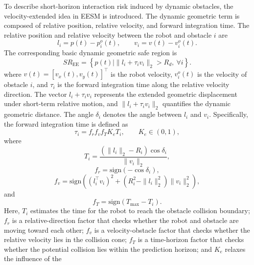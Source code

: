 \documentclass[journal]{IEEEtranTIE}
\begin{document}
    To describe short-horizon interaction risk induced by dynamic obstacles, the
    velocity-extended idea in EESM is introduced. The dynamic geometric term is
    composed of relative position, relative velocity, and forward integration
    time. The relative position and relative velocity between the robot and
    obstacle $i$ are
    \begin{equation}
    l_i=p(t)-p_i^o(t),\qquad v_i=v(t)-v_i^o(t).
    \end{equation}
    The corresponding basic dynamic geometric safe region is
    \begin{equation}
    SR_{\mathrm{EE}} =
    \left\{p(t)\mid
    \|l_i+\tau_i v_i\|_2>R_d,\ \forall i
    \right\}.
    \end{equation}
    where $v(t)=[v_x(t),v_y(t)]^\top$ is the robot velocity, $v_i^o(t)$ is the
    velocity of obstacle $i$, and $\tau_i$ is the forward integration time along
    the relative velocity direction. The vector $l_i+\tau_i v_i$ represents the
    extended geometric displacement under short-term relative motion, and
    $\|l_i+\tau_i v_i\|_2$ quantifies the dynamic geometric distance. The angle
    $\delta_i$ denotes the angle between $l_i$ and $v_i$. Specifically, the
    forward integration time is defined as
    \begin{equation}
    \tau_i=f_r f_v f_T K_e T_i,\qquad K_e\in(0,1),
    \end{equation}
    where
    \begin{equation}
    T_i=\frac{(\|l_i\|_2-R_i)\cos\delta_i}{\|v_i\|_2},
    \end{equation}
    \begin{equation}
    f_r=\mathrm{sign}(-\cos\delta_i),
    \end{equation}
    \begin{equation}
    f_v=\mathrm{sign}\left(
    (l_i^\top v_i)^2+(R_i^2-\|l_i\|_2^2)\|v_i\|_2^2
    \right),
    \end{equation}
    and
    \begin{equation}
    f_T=\mathrm{sign}(T_{\max}-T_i).
    \end{equation}
    Here, $T_i$ estimates the time for the robot to reach the obstacle collision
    boundary; $f_r$ is a relative-direction factor that checks whether the robot
    and obstacle are moving toward each other; $f_v$ is a velocity-obstacle
    factor that checks whether the relative velocity lies in the collision cone;
    $f_T$ is a time-horizon factor that checks whether the potential collision
    lies within the prediction horizon; and $K_e$ relaxes the influence of the
\end{document}

